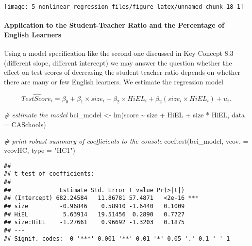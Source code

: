 \documentclass[
]{article}
\newenvironment{Shaded}{\begin{snugshade}}{\end{snugshade}}
\newcommand{\AttributeTok}[1]{\textcolor[rgb]{0.77,0.63,0.00}{#1}}
\newcommand{\CommentTok}[1]{\textcolor[rgb]{0.56,0.35,0.01}{\textit{#1}}}
\newcommand{\FunctionTok}[1]{\textcolor[rgb]{0.00,0.00,0.00}{#1}}
\newcommand{\NormalTok}[1]{#1}
\newcommand{\OtherTok}[1]{\textcolor[rgb]{0.56,0.35,0.01}{#1}}
\newcommand{\SpecialCharTok}[1]{\textcolor[rgb]{0.00,0.00,0.00}{#1}}
\newcommand{\StringTok}[1]{\textcolor[rgb]{0.31,0.60,0.02}{#1}}
\begin{document}
\begin{center}\texttt{[image: 5\_nonlinear\_regression\_files/figure-latex/unnamed-chunk-18-1]} \end{center}

\hypertarget{application-to-the-student-teacher-ratio-and-the-percentage-of-english-learners-1}{%
\paragraph*{Application to the Student-Teacher Ratio and the Percentage
of English
Learners}\label{application-to-the-student-teacher-ratio-and-the-percentage-of-english-learners-1}}

Using a model specification like the second one discussed in Key Concept
8.3 (different slope, different intercept) we may answer the question
whether the effect on test scores of decreasing the student-teacher
ratio depends on whether there are many or few English learners. We
estimate the regression model

\[ \widehat{TestScore_i} = \beta_0 + \beta_1 \times size_i + \beta_2 \times HiEL_i + \beta_2 (size_i \times HiEL_i) + u_i. \]

\begin{Shaded}
\begin{Highlighting}[]
\CommentTok{\# estimate the model}
\NormalTok{bci\_model }\OtherTok{\textless{}{-}} \FunctionTok{lm}\NormalTok{(score }\SpecialCharTok{\textasciitilde{}}\NormalTok{ size }\SpecialCharTok{+}\NormalTok{ HiEL }\SpecialCharTok{+}\NormalTok{ size }\SpecialCharTok{*}\NormalTok{ HiEL, }\AttributeTok{data =}\NormalTok{ CASchools)}

\CommentTok{\# print robust summary of coefficients to the console}
\FunctionTok{coeftest}\NormalTok{(bci\_model, }\AttributeTok{vcov. =}\NormalTok{ vcovHC, }\AttributeTok{type =} \StringTok{"HC1"}\NormalTok{)}
\end{Highlighting}
\end{Shaded}

\begin{verbatim}
## 
## t test of coefficients:
## 
##              Estimate Std. Error t value Pr(>|t|)    
## (Intercept) 682.24584   11.86781 57.4871   <2e-16 ***
## size         -0.96846    0.58910 -1.6440   0.1009    
## HiEL          5.63914   19.51456  0.2890   0.7727    
## size:HiEL    -1.27661    0.96692 -1.3203   0.1875    
## ---
## Signif. codes:  0 '***' 0.001 '**' 0.01 '*' 0.05 '.' 0.1 ' ' 1
\end{verbatim}
\end{document}
